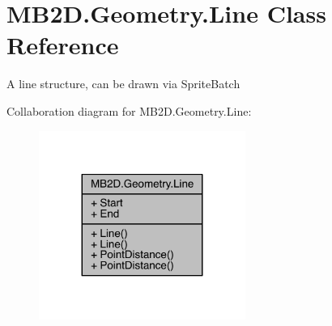 \hypertarget{class_m_b2_d_1_1_geometry_1_1_line}{}\section{M\+B2\+D.\+Geometry.\+Line Class Reference}
\label{class_m_b2_d_1_1_geometry_1_1_line}


A line structure, can be drawn via Sprite\+Batch  




Collaboration diagram for M\+B2\+D.\+Geometry.\+Line\+:
\nopagebreak
\begin{figure}[H]
\begin{center}
\leavevmode
\includegraphics[width=191pt]{class_m_b2_d_1_1_geometry_1_1_line__coll__graph}
\end{center}
\end{figure}
